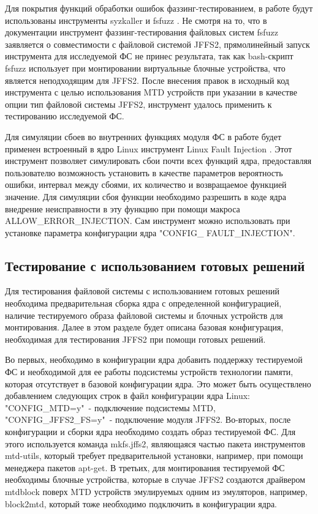 Для покрытия функций обработки ошибок фаззинг-тестированием, в работе будут использованы инструменты syzkaller \cite{syzkaller} и fsfuzz \cite{fsfuzz}. Не смотря на то, что в документации инструмент фаззинг-тестирования файловых систем fsfuzz заявляется о совместимости с файловой системой JFFS2, прямолинейный запуск инструмента для исследуемой ФС не принес результата, так как bash-скрипт fsfuzz использует при монтировании виртуальные блочные устройства, что является неподходящим для JFFS2. После внесения правок в исходный код инструмента с целью использования MTD устройств при указании в качестве опции тип файловой системы JFFS2, инструмент удалось применить к тестированию исследуемой ФС.

Для симуляции сбоев во внутренних функциях модуля ФС в работе будет применен встроенный в ядро Linux инструмент Linux Fault Injection \cite{fault}. Этот инструмент позволяет симулировать сбои почти всех функций ядра, предоставляя пользователю возможность установить в качестве параметров вероятность ошибки, интервал между сбоями, их количество и возвращаемое функцией значение. Для симуляции сбоя функции необходимо разрешить в коде ядра внедрение неисправности в эту функцию при помощи макроса ALLOW\_ERROR\_INJECTION. Сам инструмент можно использовать при установке параметра конфигурации ядра "CONFIG\_ FAULT\_INJECTION".

\subsection{Тестирование с использованием готовых решений}

Для тестирования файловой системы с использованием готовых решений необходима предварительная сборка ядра с определенной конфигурацией, наличие тестируемого образа файловой системы и блочных устройств для монтирования. Далее в этом разделе будет описана базовая конфигурация, необходимая для тестирования JFFS2 при помощи готовых решений.

Во первых, необходимо в конфигурации ядра добавить поддержку тестируемой ФС и необходимой для ее работы подсистемы устройств технологии памяти, которая отсутствует в базовой конфигурации ядра. Это может быть осуществлено добавлением следующих строк в файл конфигурации ядра Linux: "CONFIG\_MTD=y"\ - подключение подсистемы MTD, "CONFIG\_JFFS2\_FS=y"\ - подключение модуля JFFS2. Во-вторых, после конфигурации и сборки ядра необходимо создать образ тестируемой ФС. Для этого используется команда mkfs.jffs2, являющаяся частью пакета инструментов mtd-utils, который требует предварительной установки, например, при помощи менеджера пакетов apt-get. В третьих, для монтирования тестируемой ФС необходимы блочные устройства, которые в случае JFFS2 создаются драйвером mtdblock поверх MTD устройств эмулируемых одним из эмуляторов, например, block2mtd, который тоже необходимо подключить в конфигурации ядра.


